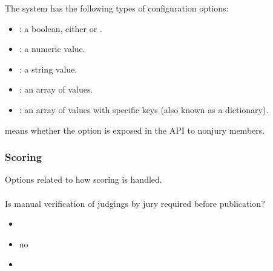 \documentclass[a4paper,10pt,english,openany]{sphinxmanual}
\begin{document}
\sphinxAtStartPar
The system has the following types of configuration options:
\begin{itemize}
\item {} 
\sphinxAtStartPar
{}: a boolean, either  or .

\item {} 
\sphinxAtStartPar
{}: a numeric value.

\item {} 
\sphinxAtStartPar
{}: a string value.

\item {} 
\sphinxAtStartPar
{}: an array of values.

\item {} 
\sphinxAtStartPar
{}: an array of values with specific keys (also known as a dictionary).

\end{itemize}

\sphinxAtStartPar
{} means whether the option is exposed in the API to non\sphinxhyphen{}jury members.


\subsubsection{Scoring}
\label{\detokenize{configuration-reference:scoring}}
\sphinxAtStartPar
Options related to how scoring is handled.


\paragraph{}
\label{\detokenize{configuration-reference:verification-required}}
\sphinxAtStartPar
Is manual verification of judgings by jury required before publication?
\begin{itemize}
\item {} 
\sphinxAtStartPar
{} 

\item {} 
\sphinxAtStartPar
{} no

\item {} 
\sphinxAtStartPar
{} 

\end{itemize}
\end{document}
